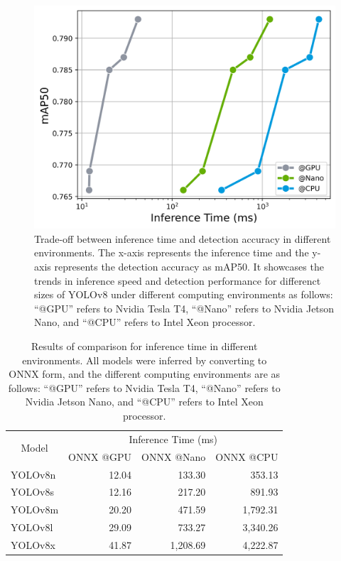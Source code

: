 \begin{figure}[!t]
    \includegraphics[scale=0.5]{fig/plot_inference_time.png}
    \caption{Trade-off between inference time and detection accuracy in different environments. The x-axis represents the inference time and the y-axis represents the detection accuracy as mAP50. It showcases the trends in inference speed and detection performance for differenct sizes of YOLOv8 under different computing environments as follows: ``@GPU'' refers to Nvidia Tesla T4, ``@Nano'' refers to Nvidia Jetson Nano, and ``@CPU'' refers to Intel Xeon processor.}
    \label{fig:inference}
\end{figure}

\begin{table}[!b]
    \caption{Results of comparison for inference time in different environments. All models were inferred by converting to ONNX form, and the different computing environments are as follows: ``@GPU'' refers to Nvidia Tesla T4, ``@Nano'' refers to Nvidia Jetson Nano, and ``@CPU'' refers to Intel Xeon processor.}
    \label{tab:inference}
    \begin{tabular}{lrrr}
    \toprule
    \multicolumn{1}{c}{\multirow{2}{*}{Model}}   & \multicolumn{3}{c}{Inference Time (ms)} \\
                                 & ONNX @GPU & ONNX @Nano & ONNX @CPU \\
    \midrule
    YOLOv8n & 12.04        & 133.30            & 353.13    \\
    YOLOv8s & 12.16        & 217.20            & 891.93    \\
    YOLOv8m & 20.20        & 471.59            & 1,792.31   \\
    YOLOv8l & 29.09       & 733.27            & 3,340.26   \\
    YOLOv8x & 41.87       & 1,208.69           & 4,222.87  \\
    \bottomrule
    \end{tabular}%
\end{table}

